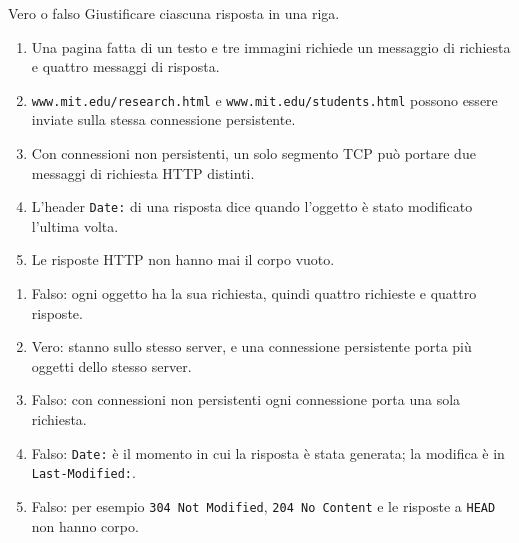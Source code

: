 \begin{esercizio}{Vero o falso}
Giustificare ciascuna risposta in una riga.
\begin{enumerate}[label=(\alph*)]
    \item Una pagina fatta di un testo e tre immagini richiede un messaggio di richiesta e quattro messaggi di risposta.
    \item \texttt{www.mit.edu/research.html} e \texttt{www.mit.edu/students.html} possono essere inviate sulla stessa connessione
          persistente.
    \item Con connessioni non persistenti, un solo segmento TCP può portare due messaggi di richiesta HTTP distinti.
    \item L'header \texttt{Date:} di una risposta dice quando l'oggetto è stato modificato l'ultima volta.
    \item Le risposte HTTP non hanno mai il corpo vuoto.
\end{enumerate}

\svolgimento
\begin{enumerate}[label=(\alph*)]
    \item Falso: ogni oggetto ha la sua richiesta, quindi quattro richieste e quattro risposte.
    \item Vero: stanno sullo stesso server, e una connessione persistente porta più oggetti dello stesso server.
    \item Falso: con connessioni non persistenti ogni connessione porta una sola richiesta.
    \item Falso: \texttt{Date:} è il momento in cui la risposta è stata generata; la modifica è in \texttt{Last-Modified:}.
    \item Falso: per esempio \texttt{304 Not Modified}, \texttt{204 No Content} e le risposte a \texttt{HEAD} non hanno corpo.
\end{enumerate}
\end{esercizio}

